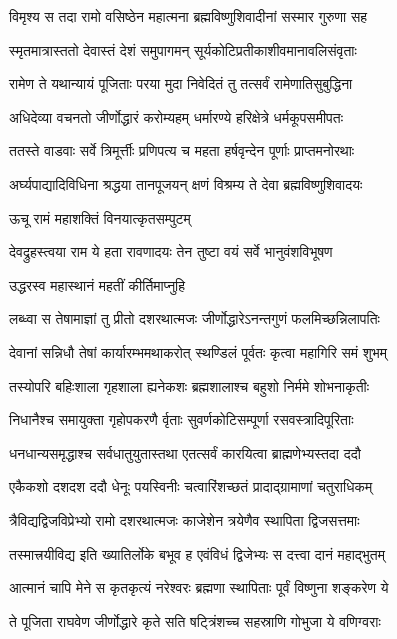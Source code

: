 \twolineshloka
{विमृश्य स तदा रामो वसिष्ठेन महात्मना}
{ब्रह्मविष्णुशिवादीनां सस्मार गुरुणा सह}

\twolineshloka
{स्मृतमात्रास्ततो देवास्तं देशं समुपागमन्}
{सूर्यकोटिप्रतीकाशीवमानावलिसंवृताः}%

\twolineshloka
{रामेण ते यथान्यायं पूजिताः परया मुदा}%
{निवेदितं तु तत्सर्वं रामेणातिसुबुद्धिना}%

\twolineshloka
{अधिदेव्या वचनतो जीर्णोद्धारं करोम्यहम्}
{धर्मारण्ये हरिक्षेत्रे धर्मकूपसमीपतः}%

\twolineshloka
{ततस्ते वाडवाः सर्वे त्रिमूर्त्तीः प्रणिपत्य च}
{महता हर्षवृन्देन पूर्णाः प्राप्तमनोरथाः}%

\twolineshloka
{अर्घ्यपाद्यादिविधिना श्रद्धया तानपूजयन्}
{क्षणं विश्रम्य ते देवा ब्रह्मविष्णुशिवादयः}%

\onelineshloka
{ऊचू रामं महाशक्तिं विनयात्कृतसम्पुटम्}%


\twolineshloka
{देवद्रुहस्त्वया राम ये हता रावणादयः}
{तेन तुष्टा वयं सर्वे भानुवंशविभूषण}%

\onelineshloka
{उद्धरस्व महास्थानं महतीं कीर्तिमाप्नुहि}%

\twolineshloka
{लब्ध्वा स तेषामाज्ञां तु प्रीतो दशरथात्मजः}
{जीर्णोद्धारेऽनन्तगुणं फलमिच्छन्निलापतिः}%

\twolineshloka
{देवानां सन्निधौ तेषां कार्यारम्भमथाकरोत्}
{स्थण्डिलं पूर्वतः कृत्वा महागिरि समं शुभम्}%

\twolineshloka
{तस्योपरि बहिःशाला गृहशाला ह्यनेकशः}
{ब्रह्मशालाश्च बहुशो निर्ममे शोभनाकृतीः}%

\twolineshloka
{निधानैश्च समायुक्ता गृहोपकरणै र्वृताः}
{सुवर्णकोटिसम्पूर्णा रसवस्त्रादिपूरिताः}%

\twolineshloka
{धनधान्यसमृद्धाश्च सर्वधातुयुतास्तथा}
{एतत्सर्वं कारयित्वा ब्राह्मणेभ्यस्तदा ददौ}%

\twolineshloka
{एकैकशो दशदश ददौ धेनूः पयस्विनीः}
{चत्वारिंशच्छतं प्रादाद्ग्रामाणां चतुराधिकम्}%

\twolineshloka
{त्रैविद्यद्विजविप्रेभ्यो रामो दशरथात्मजः}
{काजेशेन त्रयेणैव स्थापिता द्विजसत्तमाः}%

\twolineshloka
{तस्मात्त्रयीविद्य इति ख्यातिर्लोके बभूव ह}
{एवंविधं द्विजेभ्यः स दत्त्वा दानं महाद्भुतम्}%

\twolineshloka
{आत्मानं चापि मेने स कृतकृत्यं नरेश्वरः}
{ब्रह्मणा स्थापिताः पूर्वं विष्णुना शङ्करेण ये}%

\twolineshloka
{ते पूजिता राघवेण जीर्णोद्धारे कृते सति}
{षट्त्रिंशच्च सहस्राणि गोभुजा ये वणिग्वराः}%

